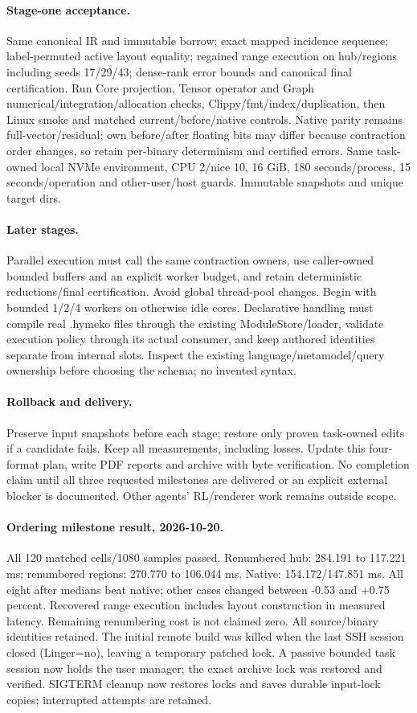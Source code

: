 \documentclass[11pt,a4paper]{article}
\begin{document}
\paragraph{Stage-one acceptance.} Same canonical IR and immutable borrow; exact mapped
incidence sequence; label-permuted active layout equality; regained range execution on
hub/regions including seeds 17/29/43; dense-rank error bounds and canonical final certification.
Run Core projection, Tensor operator and Graph numerical/integration/allocation checks,
Clippy/fmt/index/duplication, then Linux smoke and matched current/before/native controls.
Native parity remains full-vector/residual; own before/after floating bits may differ
because contraction order changes, so retain per-binary determinism and certified errors.
Same task-owned local NVMe environment, CPU 2/nice 10, 16 GiB, 180 seconds/process,
15 seconds/operation and other-user/host guards. Immutable snapshots and unique target dirs.
\paragraph{Later stages.} Parallel execution must call the same contraction owners,
use caller-owned bounded buffers and an explicit worker budget, and retain deterministic
reductions/final certification. Avoid global thread-pool changes. Begin with bounded
1/2/4 workers on otherwise idle cores. Declarative handling must compile real .hymeko
files through the existing ModuleStore/loader, validate execution policy through its
actual consumer, and keep authored identities separate from internal slots. Inspect the
existing language/metamodel/query ownership before choosing the schema; no invented syntax.
\paragraph{Rollback and delivery.} Preserve input snapshots before each stage; restore
only proven task-owned edits if a candidate fails. Keep all measurements, including
losses. Update this four-format plan, write PDF reports and archive with byte verification.
No completion claim until all three requested milestones are delivered or an explicit
external blocker is documented. Other agents' RL/renderer work remains outside scope.
\paragraph{Ordering milestone result, 2026-10-20.}
All 120 matched cells/1080 samples passed. Renumbered hub: 284.191 to 117.221 ms;
renumbered regions: 270.770 to 106.044 ms. Native: 154.172/147.851 ms.
All eight after medians beat native; other cases changed between -0.53 and +0.75
percent. Recovered range execution includes layout construction in measured latency.
Remaining renumbering cost is not claimed zero. All source/binary identities retained.
The initial remote build was killed when the last SSH session closed (Linger=no),
leaving a temporary patched lock. A passive bounded task session now holds the user
manager; the exact archive lock was restored and verified. SIGTERM cleanup now
restores locks and saves durable input-lock copies; interrupted attempts are retained.
\end{document}
